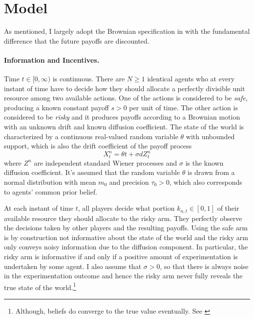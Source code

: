 \section*{Model}
As mentioned, I largely adopt the Brownian specification in \cite{keller2020undiscounted} with the fundamental difference that the future payoffs are discounted.

\paragraph{Information and Incentives.} Time $t \in [0, \infty)$ is continuous. There are $N \geq 1$ identical agents who at every instant of time have to decide how they should allocate a perfectly divisible unit resource among two available actions. One of the actions is considered to be \textit{safe}, producing a known constant payoff $s > 0$ per unit of time. The other action is considered to be \textit{risky} and it produces payoffs according to a Brownian motion with an unknown drift and known diffusion coefficient. The state of the world is characterized by a continuous real-valued random variable $\theta$ with unbounded support, which is also the drift coefficient of the payoff process
\[ X_{t}^n = \theta t + \sigma dZ_t^n\]
where $Z^n$ are independent standard Wiener processes and $\sigma$ is the known diffusion coefficient. It's assumed that the random variable $\theta$ is drawn from a normal distribution with mean $m_0$ and precision $\tau_0 > 0$, which also corresponds to agents' common prior belief. 

At each instant of time $t$, all players decide what portion $k_{n,t} \in [0,1]$ of their available resource they should allocate to the risky arm. They perfectly observe the decisions taken by other players and the resulting payoffs. Using the safe arm is by construction not informative about the state of the world and the risky arm only conveys noisy information due to the diffusion component. In particular, the risky arm is informative if and only if a positive amount of experimentation is undertaken by some agent. I also assume that $\sigma > 0$, so that there is always noise in the experimentation outcome and hence the risky arm never fully reveals the true state of the world.\footnote{Although, beliefs do converge to the true value eventually. See \cite{keller2009brownian}}


